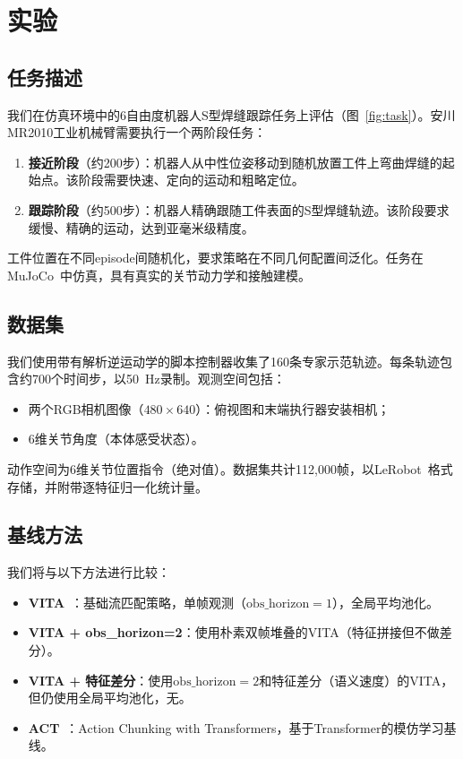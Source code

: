 \section{实验}
\label{sec:experiments}

\subsection{任务描述}
\label{sec:task}

我们在仿真环境中的6自由度机器人S型焊缝跟踪任务上评估\method{}（图~\ref{fig:task}）。安川MR2010工业机械臂需要执行一个两阶段任务：

\begin{enumerate}[leftmargin=*,itemsep=2pt]
    \item \textbf{接近阶段}（约200步）：机器人从中性位姿移动到随机放置工件上弯曲焊缝的起始点。该阶段需要快速、定向的运动和粗略定位。
    \item \textbf{跟踪阶段}（约500步）：机器人精确跟随工件表面的S型焊缝轨迹。该阶段要求缓慢、精确的运动，达到亚毫米级精度。
\end{enumerate}

工件位置在不同episode间随机化，要求策略在不同几何配置间泛化。任务在MuJoCo~\cite{todorov2012mujoco}中仿真，具有真实的关节动力学和接触建模。

\subsection{数据集}
\label{sec:dataset}

我们使用带有解析逆运动学的脚本控制器收集了160条专家示范轨迹。每条轨迹包含约700个时间步，以50~Hz录制。观测空间包括：
\begin{itemize}[leftmargin=*,itemsep=1pt]
    \item 两个RGB相机图像（$480 \times 640$）：俯视图和末端执行器安装相机；
    \item 6维关节角度（本体感受状态）。
\end{itemize}
动作空间为6维关节位置指令（绝对值）。数据集共计112,000帧，以LeRobot~\cite{cadene2024lerobot}格式存储，并附带逐特征归一化统计量。

\subsection{基线方法}
\label{sec:baselines}

我们将\method{}与以下方法进行比较：

\begin{itemize}[leftmargin=*,itemsep=2pt]
    \item \textbf{VITA}~\cite{gao2026vita}：基础流匹配策略，单帧观测（$\text{obs\_horizon}=1$），全局平均池化。
    \item \textbf{VITA + obs\_horizon=2}：使用朴素双帧堆叠的VITA（特征拼接但不做差分）。
    \item \textbf{VITA + 特征差分}：使用$\text{obs\_horizon}=2$和特征差分（语义速度）的VITA，但仍使用全局平均池化，无\fasa{}。
    \item \textbf{ACT}~\cite{zhao2023act}：Action Chunking with Transformers，基于Transformer的模仿学习基线。
\end{itemize}

